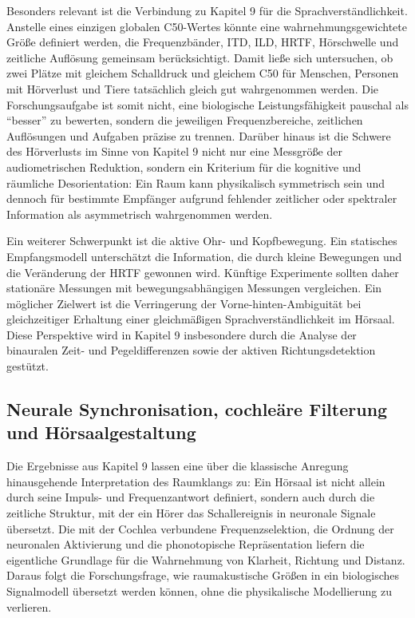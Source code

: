 ﻿\documentclass[12pt, a4paper]{article}
\theoremstyle{definition}
\theoremstyle{remark}
\begin{document}
Besonders relevant ist die Verbindung zu Kapitel 9 für die Sprachverständlichkeit.
Anstelle eines einzigen globalen C50-Wertes könnte eine wahrnehmungsgewichtete Größe
definiert werden, die Frequenzbänder, ITD, ILD, HRTF, Hörschwelle und zeitliche
Auflösung gemeinsam berücksichtigt. Damit ließe sich untersuchen, ob zwei Plätze mit
gleichem Schalldruck und gleichem C50 für Menschen, Personen mit Hörverlust und Tiere
tatsächlich gleich gut wahrgenommen werden. Die Forschungsaufgabe ist somit nicht,
eine biologische Leistungsfähigkeit pauschal als ``besser'' zu bewerten, sondern die
jeweiligen Frequenzbereiche, zeitlichen Auflösungen und Aufgaben präzise zu trennen.
Darüber hinaus ist die Schwere des Hörverlusts im Sinne von Kapitel 9 nicht nur eine
Messgröße der audiometrischen Reduktion, sondern ein Kriterium für die kognitive
und räumliche Desorientation: Ein Raum kann physikalisch symmetrisch sein und dennoch
für bestimmte Empfänger aufgrund fehlender zeitlicher oder spektraler Information als
asymmetrisch wahrgenommen werden.

Ein weiterer Schwerpunkt ist die aktive Ohr- und Kopfbewegung. Ein statisches
Empfangsmodell unterschätzt die Information, die durch kleine Bewegungen und die
Veränderung der HRTF gewonnen wird. Künftige Experimente sollten daher stationäre
Messungen mit bewegungsabhängigen Messungen vergleichen. Ein möglicher Zielwert ist
die Verringerung der Vorne-hinten-Ambiguität bei gleichzeitiger Erhaltung einer
gleichmäßigen Sprachverständlichkeit im Hörsaal. Diese Perspektive wird in Kapitel 9
insbesondere durch die Analyse der binauralen Zeit- und Pegeldifferenzen sowie der
aktiven Richtungsdetektion gestützt.

\subsection{Neurale Synchronisation, cochleäre Filterung und Hörsaalgestaltung}

Die Ergebnisse aus Kapitel 9 lassen eine über die klassische Anregung hinausgehende
Interpretation des Raumklangs zu: Ein Hörsaal ist nicht allein durch seine Impuls-
und Frequenzantwort definiert, sondern auch durch die zeitliche Struktur, mit der ein
Hörer das Schallereignis in neuronale Signale übersetzt. Die mit der Cochlea
verbundene Frequenzselektion, die Ordnung der neuronalen Aktivierung und die
phonotopische Repräsentation liefern die eigentliche Grundlage für die Wahrnehmung
von Klarheit, Richtung und Distanz. Daraus folgt die Forschungsfrage, wie raumakustische
Größen in ein biologisches Signalmodell übersetzt werden können, ohne die physikalische
Modellierung zu verlieren.
\end{document}

